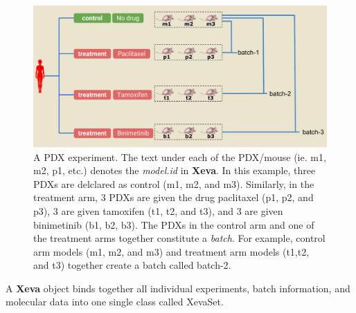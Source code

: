 \documentclass{article}\usepackage[]{graphicx}\usepackage[usenames,dvipsnames]{color}
\begin{document}
\begin{figure}[!ht]
    \centering
    \includegraphics[keepaspectratio=true,width=1\textwidth]{images/Xeva_batch_2.pdf}
    \caption{A PDX experiment. The text under each of the PDX/mouse (ie. m1, m2, p1, etc.) denotes the \textit{model.id} in \textbf{Xeva}. In this example, three PDXs are delclared as control (m1, m2, and m3). Similarly, in the treatment arm, 3 PDXs are given the drug paclitaxel (p1, p2, and p3), 3 are given tamoxifen (t1, t2, and t3), and 3 are given binimetinib (b1, b2, b3). The PDXs in the control arm and one of the treatment arms together constitute a \textit{batch}. For example, control arm models (m1, m2, and m3) and treatment arm models (t1,t2, and t3) together create a batch called batch-2. } \label{fig:1}
\end{figure}

A \textbf{Xeva} object binds together all individual experiments, batch information, and molecular data into one single class called XevaSet.
\end{document}
